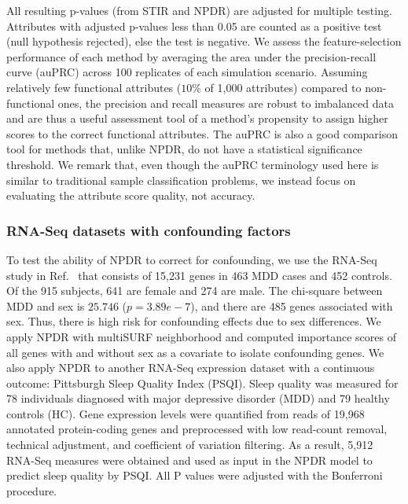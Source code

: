 \documentclass[10pt]{article}
\begin{document}
All resulting p-values (from STIR and NPDR) are adjusted for multiple testing.
Attributes with adjusted p-values less than 0.05 are counted as a positive test (null hypothesis rejected), else the test is negative.
We assess the feature-selection performance of each method by averaging the area under the precision-recall curve (auPRC) across 100 replicates of each simulation scenario.
Assuming relatively few functional attributes ($10\%$ of 1,000 attributes) compared to non-functional ones, the precision and recall measures are robust to imbalanced data and are thus a useful assessment tool of a method's propensity to assign higher scores to the correct functional attributes. The auPRC is also a good comparison tool for methods that, unlike NPDR, do not have a statistical significance threshold. We remark that, even though the auPRC terminology used here is similar to traditional sample classification problems, we instead focus on evaluating the attribute score quality, not accuracy.

\subsubsection{RNA-Seq datasets with confounding factors}
To test the ability of NPDR to correct for confounding, we use the RNA-Seq study in Ref.~\cite{mostafavi14} that consists of 15,231 genes in 463 MDD cases and 452 controls.
Of the 915 subjects, 641 are female and 274 are male.
The chi-square between MDD and sex is $25.746$ ($p=3.89e-7$), and there are 485 genes associated with sex.
Thus, there is high risk for confounding effects due to sex differences.
We apply NPDR with multiSURF neighborhood and computed importance scores of all genes with and without sex as a covariate to isolate confounding genes. 
We also apply NPDR to another RNA-Seq expression dataset with a continuous outcome: Pittsburgh Sleep Quality Index (PSQI). Sleep quality was measured for 78 individuals diagnosed with major depressive disorder (MDD) and 79 healthy controls (HC)\cite{le18}.
Gene expression levels were quantified from reads of 19,968 annotated protein-coding genes and preprocessed with low read-count removal, technical adjustment, and coefficient of variation filtering.
As a result, 5,912 RNA-Seq measures were obtained and used as input in the NPDR model to predict sleep quality by PSQI\cite{psqi}.
All P values were adjusted with the Bonferroni procedure.
\end{document}
